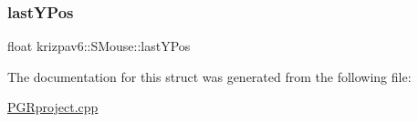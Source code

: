 \mbox{\label{structkrizpav6_1_1_s_mouse_ae935b9d5f298750750a9f86a006fd479}} 
\subsubsection{\texorpdfstring{lastYPos}{lastYPos}}
{\footnotesize\ttfamily float krizpav6\+::\+S\+Mouse\+::last\+Y\+Pos}



The documentation for this struct was generated from the following file\+:\begin{DoxyCompactItemize}
\item 
\mbox{\hyperlink{_p_g_rproject_8cpp}{P\+G\+Rproject.\+cpp}}\end{DoxyCompactItemize}
